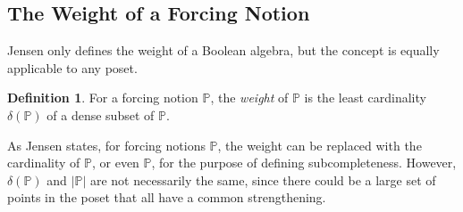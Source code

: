 \documentclass{amsart}
\theoremstyle{definition}
\newtheorem{definition}[theorem]{Definition}
\theoremstyle{remark}
\renewcommand{\P}{\mathbb{P}}
\begin{document}
\subsection{The Weight of a Forcing Notion}
\label{subsec:delta}
Jensen only defines the weight of a Boolean algebra, but the concept is equally applicable to any poset.

\begin{definition} For a forcing notion $\P$, the \emph{weight} of \(\P\) is the least cardinality $\delta(\P)$ of a dense subset of $\P$. 
\end{definition}

As Jensen states, for forcing notions $\P$, the weight can be replaced with the cardinality of $\P$, or even $\P$, for the purpose of defining subcompleteness. However, $\delta(\P)$ and $|\P|$ are not necessarily the same, since there could be a large set of points in the poset that all have a common strengthening. 
\end{document}
